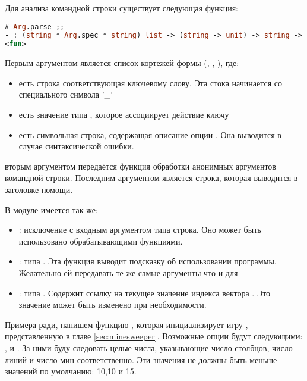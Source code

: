 Для анализа командной строки существует следующая функция:

\begin{lstlisting}[language=OCaml]
# Arg.parse ;;
- : (string * Arg.spec * string) list -> (string -> unit) -> string -> unit =
<fun>
\end{lstlisting}

Первым аргументом является список кортежей формы (, , 
), где: 

\begin{itemize}
	\item {} есть строка соответствующая ключевому слову. Эта стока 
начинается со специального символа '\_'

	\item {} есть значение типа , которое ассоциирует 
действие ключу 

	\item {} есть символьная строка, содержащая описание опции 
. Она выводится в случае синтаксической ошибки.
\end{itemize}

вторым аргументом передаётся функция обработки анонимных аргументов командной 
строки. Последним аргументом является строка, которая выводится в заголовке 
помощи.

В модуле  имеется так же:

\begin{itemize}
	\item {}: исключение с входным аргументом типа строка. Оно может 
быть использовано обрабатывающими функциями. 

	\item {} : типа . Эта функция выводит подсказку об использовании программы. Желательно 
ей передавать те же самые аргументы что и для 

	\item {}: типа . Содержит ссылку на текущее 
значение индекса вектора . Это значение может быть изменено при 
необходимости. 
\end{itemize}

Примера ради, напишем функцию , которая инициализирует игру 
, представленную в главе \ref{sec:minesweeper}. Возможные опции будут 
следующими: ,  и . За ними буду следовать 
целые числа, указывающие число столбцов, число линий и число мин соответственно. 
Эти значения не должны быть меньше значений по умолчанию: 10,10 и 15.

